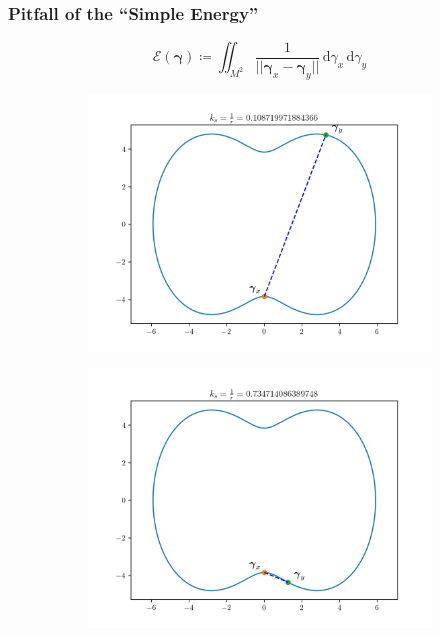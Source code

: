 \documentclass{beamer}
\theoremstyle{remark}
\newcommand{\gammabf}{\boldsymbol{\gamma}}
\newcommand{\intd}{\, \text{d}}
\newcommand{\norm}[1]{\lvert \lvert #1 \rvert \rvert}
\begin{document}
\begin{frame}
    \frametitle{Pitfall of the ``Simple Energy''}
        \begin{equation*}
            \mathcal{E} \left( \gammabf \right) \coloneqq \iint_{M^2} \frac{1}{\norm{\gammabf_x - \gammabf_y}} \intd \gamma_x \intd \gamma_y
        \end{equation*}
        \begin{figure}[h]
            \centering
            \begin{subfigure}[b]{0.45\textwidth}
                \centering
                \includegraphics[width=\textwidth]{simple-0}
            \end{subfigure}
            \begin{subfigure}[b]{0.45\textwidth}
                \centering
                \includegraphics[width=\textwidth]{simple-1}
            \end{subfigure}
        \end{figure}
\end{frame}
\end{document}

